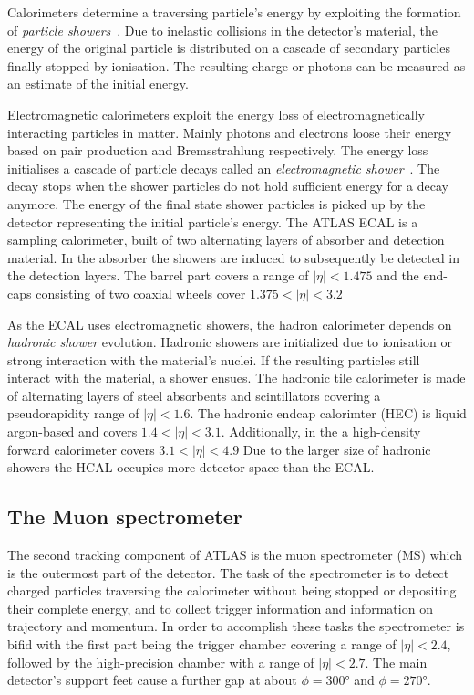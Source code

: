 Calorimeters determine a traversing particle's energy by exploiting the formation of \emph{particle showers}~\cite{wermes}. Due to inelastic collisions in the detector's material, the energy of the original particle is distributed on a cascade of secondary particles finally stopped by ionisation. The resulting charge or photons can be measured as an estimate of the initial energy.

Electromagnetic calorimeters exploit the energy loss of electromagnetically interacting particles in matter. Mainly photons and electrons loose their energy based on pair production and Bremsstrahlung respectively. The energy loss initialises a cascade of particle decays called an \emph{electromagnetic shower}~\cite{wermes}. The decay stops when the shower particles do not hold sufficient energy for a decay anymore. The energy of the final state shower particles is picked up by the detector representing the initial particle's energy.
The ATLAS ECAL is a sampling calorimeter, built of two alternating layers of absorber and detection material. In the absorber the showers are induced to subsequently be detected in the detection layers.
The barrel part covers a range of $|\eta| < 1.475$ and the end-caps consisting of two coaxial wheels cover $1.375 < |\eta| < 3.2$


As the ECAL uses electromagnetic showers, the hadron calorimeter depends on \emph{hadronic shower} evolution. Hadronic showers are initialized due to ionisation or strong interaction with the material's nuclei. If the resulting particles still interact with the material, a shower ensues.
The hadronic tile calorimeter is made of alternating layers of steel absorbents and scintillators covering a pseudorapidity range of $|\eta| < 1.6$.
The hadronic endcap calorimter (HEC) is liquid argon-based and covers $1.4 < |\eta| < 3.1$. Additionally, in the a high-density forward calorimeter covers $3.1 < |\eta| < 4.9$
Due to the larger size of hadronic showers the HCAL occupies more detector space than the ECAL.


\subsection{The Muon spectrometer}

The second tracking component of ATLAS is the muon spectrometer (MS) which is the outermost part of the detector. The task of the spectrometer is to detect charged particles traversing the calorimeter without being stopped or depositing their complete energy, and to collect trigger information and information on trajectory and momentum. In order to accomplish these tasks the spectrometer is bifid with the first part being the trigger chamber covering a range of $|\eta|<2.4$, followed by the high-precision chamber with a range of $|\eta|<2.7$. The main detector's support feet cause a further gap at about $\phi = \ang{300}$ and $\phi = \ang{270}$.

